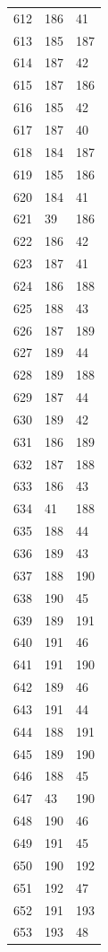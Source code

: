 \documentclass[a4paper,11pt]{article}
\begin{document}
\begin{center}
\begin{longtable}{|R{1.5cm}|R{1.5cm}|R{1.5cm}|}
  612 &  186 &   41 \\
  613 &  185 &  187 \\
  614 &  187 &   42 \\
  615 &  187 &  186 \\
  616 &  185 &   42 \\
  617 &  187 &   40 \\
  618 &  184 &  187 \\
  619 &  185 &  186 \\
  620 &  184 &   41 \\
  621 &   39 &  186 \\
  622 &  186 &   42 \\
  623 &  187 &   41 \\
  624 &  186 &  188 \\
  625 &  188 &   43 \\
  626 &  187 &  189 \\
  627 &  189 &   44 \\
  628 &  189 &  188 \\
  629 &  187 &   44 \\
  630 &  189 &   42 \\
  631 &  186 &  189 \\
  632 &  187 &  188 \\
  633 &  186 &   43 \\
  634 &   41 &  188 \\
  635 &  188 &   44 \\
  636 &  189 &   43 \\
  637 &  188 &  190 \\
  638 &  190 &   45 \\
  639 &  189 &  191 \\
  640 &  191 &   46 \\
  641 &  191 &  190 \\
  642 &  189 &   46 \\
  643 &  191 &   44 \\
  644 &  188 &  191 \\
  645 &  189 &  190 \\
  646 &  188 &   45 \\
  647 &   43 &  190 \\
  648 &  190 &   46 \\
  649 &  191 &   45 \\
  650 &  190 &  192 \\
  651 &  192 &   47 \\
  652 &  191 &  193 \\
  653 &  193 &   48 \\

\end{longtable}
\end{center}
\end{document}
